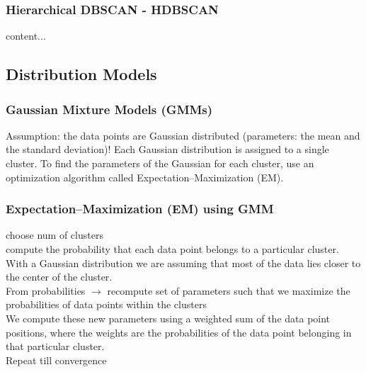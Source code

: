 \documentclass{beamer}
\begin{document}
\begin{frame}\frametitle{Hierarchical DBSCAN - HDBSCAN}
	content...
\end{frame}



\subsection{Distribution Models}
\begin{frame}\frametitle{Gaussian Mixture Models (GMMs)}
Assumption: the data points are Gaussian distributed (parameters: the mean and the standard deviation)! Each Gaussian distribution is assigned to a single cluster.
To find the parameters of the Gaussian for each cluster, use an optimization algorithm called Expectation–Maximization (EM). 

\end{frame}

\begin{frame}\frametitle{Expectation–Maximization (EM) using GMM}
choose num of clusters\\
compute the probability that each data point belongs to a particular cluster. With a Gaussian distribution we are assuming that most of the data lies closer to the center of the cluster.\\
From probabilities $\rightarrow$ recompute set of parameters such that we maximize the probabilities of data points within the clusters\\
We compute these new parameters using a weighted sum of the data point positions, where the weights are the probabilities of the data point belonging in that particular cluster.\\
Repeat till convergence\\

\end{frame}
\end{document}
